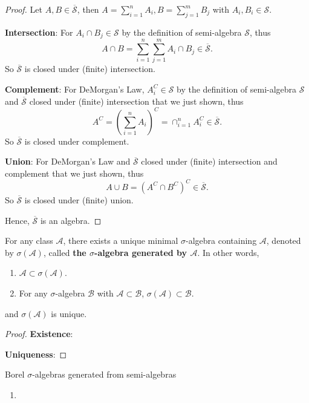 \begin{proof}
    Let $A,B\in\overline{\mathcal{S}}$, then $A=\sum_{i=1}^{n}A_i, B=\sum_{j=1}^{m}B_j$ with $A_i,B_i\in\mathcal{S}$.\par
    \textbf{Intersection}: For $A_i\cap B_j\in\mathcal{S}$ by the definition of semi-algebra $\mathcal{S}$, thus $$A\cap B=\sum_{i=1}^{n}\sum_{j=1}^{m}A_i\cap B_j\in\overline{\mathcal{S}}.$$ So $\overline{\mathcal{S}}$ is closed under (finite) intersection.\par
    \textbf{Complement}: For DeMorgan's Law, $A_i^C\in\mathcal{S}$ by the definition of semi-algebra $\mathcal{S}$ and $\overline{\mathcal{S}}$ closed under (finite) intersection that we just shown, thus $$A^C=(\sum_{i=1}^{n}A_i)^C=\cap_{i=1}^{n}A_i^C\in\overline{\mathcal{S}}.$$ So $\overline{\mathcal{S}}$ is closed under complement.\par
    \textbf{Union}: For DeMorgan's Law and $\overline{\mathcal{S}}$ closed under (finite) intersection and complement that we just shown, thus $$A\cup B=(A^C\cap B^C)^C\in\overline{\mathcal{S}}.$$ So $\overline{\mathcal{S}}$ is closed under (finite) union.\par
    Hence, $\overline{\mathcal{S}}$ is an algebra.
\end{proof}

\begin{theorem}{}{}
    For any class $\mathcal{A}$, there exists a unique minimal $\sigma$-algebra containing $\mathcal{A}$, denoted by $\sigma(\mathcal{A})$, called \textbf{the $\sigma$-algebra generated by $\mathcal{A}$}. In other words,
    \begin{enumerate}
        \item $\mathcal{A}\subset\sigma(\mathcal{A})$.
        \item For any $\sigma$-algebra $\mathcal{B}$ with $\mathcal{A}\subset\mathcal{B}$, $\sigma(\mathcal{A})\subset\mathcal{B}$.
    \end{enumerate}
    and $\sigma(\mathcal{A})$ is unique.
\end{theorem}

\begin{proof}
    \textbf{Existence}:\par
    \textbf{Uniqueness}:\par
\end{proof}

\begin{example}{Borel $\sigma$-algebras generated from semi-algebras}{}
    \begin{enumerate}
        \item 
    \end{enumerate}
\end{example}

